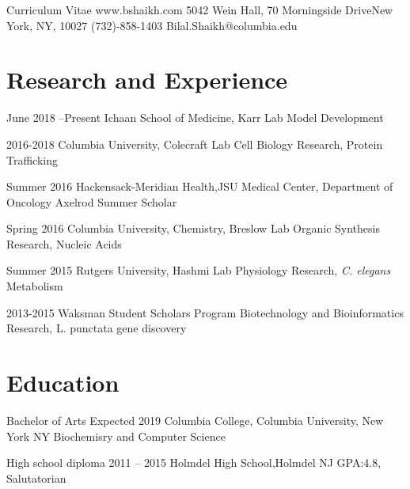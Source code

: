 \documentclass{bscv}
\begin{document}
  {Curriculum Vitae} {www.bshaikh.com} {5042 Wein Hall, 70 Morningside Drive\newline New York, NY, 10027} {(732)-858-1403} {Bilal.Shaikh@columbia.edu}


\section{Research and Experience}

\begin{eventlist}
 
\item{June 2018 --Present} 
  {Ichaan School of Medicine, Karr Lab}
  {Model Development}

\item{2016-2018}
  {Columbia University, Colecraft Lab}
  {Cell Biology Research, Protein Trafficking}

\item{Summer 2016}
  {Hackensack-Meridian Health,\newline JSU Medical Center, Department of Oncology}
  {Axelrod Summer Scholar}
  
\item{Spring 2016}
  {Columbia University, Chemistry, Breslow Lab}
  {Organic Synthesis Research, Nucleic Acids}

\item{Summer 2015}
  {Rutgers University, Hashmi Lab}
  { Physiology Research, \textit{C. elegans} Metabolism}
  
\item{2013-2015}
  {Waksman Student Scholars Program}
  {Biotechnology and Bioinformatics Research, L. punctata gene discovery}
\end{eventlist}

\section{Education}

\begin{yearlist}

\item[Bachelor of Arts]{Expected  2019}
  {Columbia College, \newline Columbia University, \newline New York NY} {Biochemisry and \newline Computer Science}

  

\item[High school diploma]{2011 -- 2015}
  {Holmdel High School,\newline Holmdel NJ}
  {GPA:4.8, Salutatorian}
  
\end{yearlist}
\end{document}
